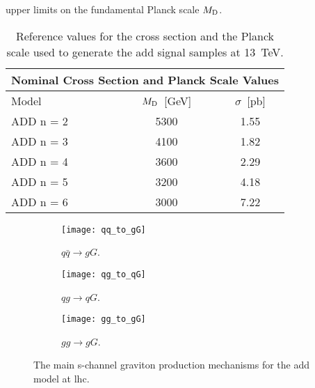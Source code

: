 upper limits on the fundamental Planck scale $M_\mathrm{D}$.
\begin{table}[!h]
  \centering
  \begin{tabular}{lcc}
    \toprule
    \multicolumn{3}{c}{Nominal Cross Section and Planck Scale Values} \\
    \midrule \midrule
    Model & $M_\mathrm{D}$~[GeV] & $\sigma$~[pb] \\
    \midrule
    ADD n = 2 & 5300 & 1.55 \\
    ADD n = 3 & 4100 & 1.82 \\
    ADD n = 4 & 3600 & 2.29 \\
    ADD n = 5 & 3200 & 4.18 \\
    ADD n = 6 & 3000 & 7.22 \\
    \bottomrule
  \end{tabular}
  \caption{Reference values for the cross section and the Planck scale used to
    generate the \gls{add} signal samples at 13~TeV.}
  \label{tab:sigma_md_ref}
\end{table}
\begin{figure}[!h]
  \centering
  \begin{subfigure}{.48\linewidth}
    \texttt{[image: qq\_to\_gG]}
    \caption{$q \bar{q} \rightarrow g G$.}
  \end{subfigure}
  \begin{subfigure}{.48\linewidth}
    \texttt{[image: qg\_to\_qG]}
    \caption{$q g \rightarrow q G$.}
  \end{subfigure}
  \begin{subfigure}{.48\linewidth}
    \texttt{[image: gg\_to\_gG]}
    \caption{$g g \rightarrow g G$.}
  \end{subfigure}
  \caption{The main s-channel graviton production mechanisms for the \gls{add}
    model at \gls{lhc}.}
  \label{fig:add_feynman}
\end{figure}

